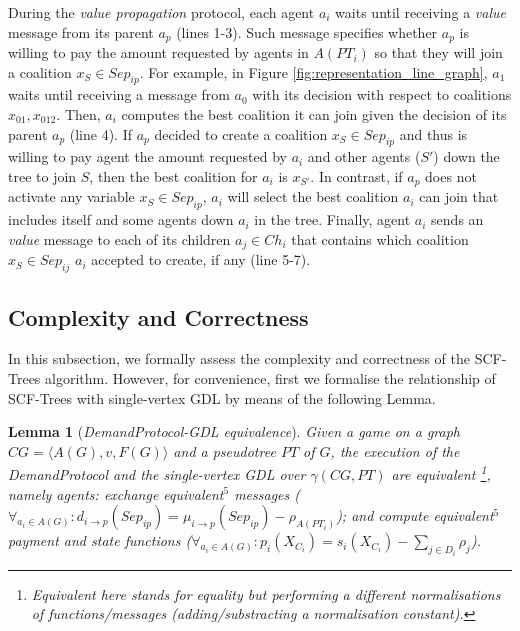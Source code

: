 \documentclass{aamas2012}
\newtheorem{lemma}{Lemma}
\begin{document}
During the \emph{value propagation} protocol, each agent $a_i$ waits until
receiving a \emph{value} message from its parent $a_p$ (lines 1-3). Such message
specifies whether $a_p$ is willing to pay the amount requested by agents in
$A(PT_i)$ so that they will join a coalition $x_S\in Sep_{ip}$. For example, in
Figure \ref{fig:representation_line_graph}, $a_1$ waits until receiving a
message from $a_0$ with its decision with respect to coalitions
$x_{01},x_{012}$. Then, $a_i$ computes the best coalition it can join given the
decision of its parent $a_p$ (line 4). If $a_p$ decided to create a coalition
$x_S\in Sep_{ip}$ and thus is willing to pay agent the amount requested by $a_i$
and other agents ($S'$) down the tree to join $S$, then the best coalition for
$a_i$ is $x_{S'}$. In contrast, if $a_p$ does not activate any variable $x_S\in
Sep_{ip}$, $a_i$ will select the best coalition
 $a_i$ can join that includes itself and some agents down $a_i$ in
the tree. Finally, agent $a_i$ sends an \emph{value} message to each of its
children $a_j \in Ch_i$ that contains which coalition $x_S\in Sep_{ij}$ $a_i$ accepted to
create, if any (line 5-7).



\subsection{Complexity and Correctness}
In this subsection, we formally
assess the complexity and correctness of the SCF-Trees
algorithm. However, for convenience, first we formalise the relationship of
SCF-Trees with single-vertex GDL by means of the following Lemma.

\begin{lemma}[\emph{DemandProtocol-GDL equivalence}]
\label{lem:demandprotocolgdl_equivalence}
Given a game on a graph $CG = \langle A(G), v, F(G)\rangle $ and a
pseudotree $PT$ of $G$, the execution of the DemandProtocol and the
single-vertex GDL over $\gamma(CG,PT)$ are equivalent \footnote{Equivalent
here stands for equality but performing a different normalisations of
functions/messages (adding/substracting a normalisation constant).}, namely
agents: exchange equivalent$^5$ messages ($\forall_{a_i\in A(G)}: d_{i
\rightarrow p}(Sep_{ip})= \mu_{i \rightarrow p}(Sep_{ip}) - \rho_{A(PT_i)}$);
and compute equivalent$^5$ payment and state functions ($\forall_{a_i\in A(G)}:
p_i(X_{C_i})  = s_i(X_{C_i}) - \sum_{j\in D_i}\rho_{j}$).

\end{lemma}
\end{document}
